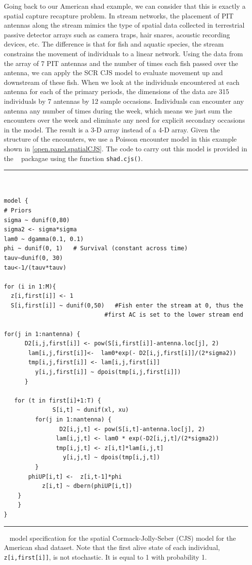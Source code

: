 Going back to our American shad example, we can consider that this is
exactly a spatial capture recapture problem.  In stream networks, the
placement of PIT antennas along the stream mimics the type of spatial
data collected in terrestrial passive detector arrays such as camera
traps, hair snares, acoustic recording devices, etc.  The difference
is that for fish and aquatic species, the stream constrains the
movement of individuals to a linear network.  Using the data from the
array of 7 PIT antennas and the number of times each fish passed over
the antenna, we can apply the SCR CJS model to evaluate movement up
and downstream of these fish.  When we look at the individuals
encountered at each antenna for each of the primary periods, the
dimensions of the data are 315 individuals by 7 antennas by 12 sample
occasions. Individuals can encounter any antenna any number of times
during the week, which means we just sum the encounters over the week
and eliminate any need for explicit secondary occasions in the
model. The result is a 3-D array instead of a 4-D array.  Given the
structure of the encounters, we use a Poisson encounter model in this
example shown in \ref{open.panel.spatialCJS}.  The code to carry out this
model is provided in the \scrbook~ packagae using the function \verb+shad.cjs()+.


\begin{panel}[htp]
\centering
\rule[0.1in]{\textwidth}{.03in}
{\small
\begin{verbatim}


model {
# Priors
sigma ~ dunif(0,80)
sigma2 <- sigma*sigma
lam0 ~ dgamma(0.1, 0.1)
phi ~ dunif(0, 1)   # Survival (constant across time)
tauv~dunif(0, 30)
tau<-1/(tauv*tauv)

for (i in 1:M){
  z[i,first[i]] <- 1
  S[i,first[i]] ~ dunif(0,50)   #Fish enter the stream at 0, thus the
			                 #first AC is set to the lower stream end

for(j in 1:nantenna) {
	  D2[i,j,first[i]] <- pow(S[i,first[i]]-antenna.loc[j], 2)
       lam[i,j,first[i]]<-  lam0*exp(- D2[i,j,first[i]]/(2*sigma2))
       tmp[i,j,first[i]] <- lam[i,j,first[i]]
         y[i,j,first[i]] ~ dpois(tmp[i,j,first[i]])
      }

   for (t in first[i]+1:T) {
	          S[i,t] ~ dunif(xl, xu) 
         for(j in 1:nantenna) {
		        D2[i,j,t] <- pow(S[i,t]-antenna.loc[j], 2)
               lam[i,j,t] <- lam0 * exp(-D2[i,j,t]/(2*sigma2))
	           tmp[i,j,t] <- z[i,t]*lam[i,j,t]
		         y[i,j,t] ~ dpois(tmp[i,j,t])
		 }
 	   phiUP[i,t] <-  z[i,t-1]*phi
	       z[i,t] ~ dbern(phiUP[i,t])
	}
	}
}
\end{verbatim}
}
\rule[-0.1in]{\textwidth}{.03in}
\caption{
\jags~ model specification for the spatial
Cormack-Jolly-Seber (CJS) model for the American shad dataset. Note that the first alive state of
each individual, \mbox{\tt z[i,first[i]]}, is not stochastic. It is
equal to 1 with probability 1.}
\label{open.panel.spatialCJS}
\end{panel}







